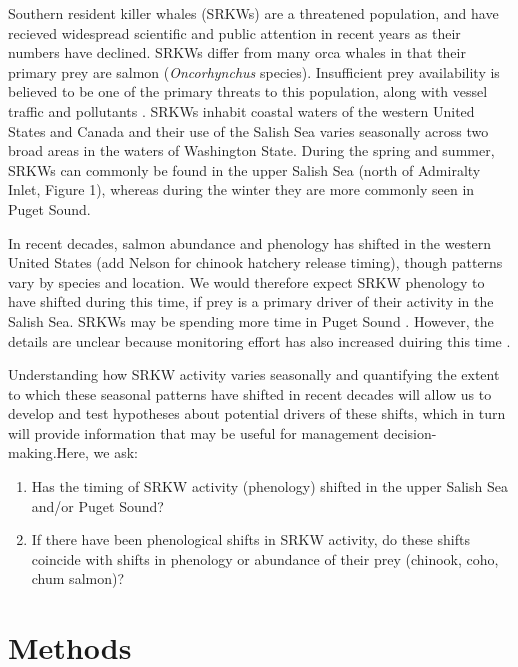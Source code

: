 \documentclass{article}
\begin{document}
\par Southern resident killer whales (SRKWs) are a threatened population, and have recieved widespread scientific and public attention in recent years as their numbers have declined\citep[e.g., seattle times articles,][]{lusseau2009,larson2018, olson2018}. SRKWs differ from many orca whales in that their primary prey are salmon (\emph{Oncorhynchus} species).  Insufficient prey availability is believed to be one of the primary threats to this population, along with vessel traffic and pollutants \citep{krahn2007,lusseau2009,hanson2010}. SRKWs inhabit coastal waters of the western United States and Canada and their use of the Salish Sea varies seasonally across two broad areas in the waters of Washington State. During the spring and summer, SRKWs can commonly be found in the upper Salish Sea (north of Admiralty Inlet, Figure 1), whereas during the winter they are more commonly seen in  Puget Sound.
\par In recent decades, salmon abundance and phenology has shifted in the western United States \citep{weinheimer2017,reed2011,ford2006,satterthwaite2014}(add Nelson for chinook hatchery release timing), though patterns vary by species and location. We would therefore expect SRKW phenology to have shifted during this time, if prey is a primary driver of their activity in the Salish Sea. SRKWs may be spending more time in Puget Sound \citep{olson2018}. However, the details are unclear because monitoring effort has also increased duiring this time \citep{olson2018, strebel2014}. 
\par Understanding how SRKW activity varies seasonally and quantifying the extent to which these seasonal patterns have shifted in recent decades will allow us to develop and test hypotheses about potential drivers of these shifts, which in turn will provide information that may be useful for management decision-making.Here, we ask:
\begin{enumerate}
\item Has the timing of SRKW activity (phenology) shifted in the upper Salish Sea and/or Puget Sound? 
\item If there have been phenological shifts in SRKW activity, do these shifts coincide with shifts in phenology or abundance of their prey (chinook, coho, chum salmon)?
\end{enumerate}


\section* {Methods}
\end{document}
